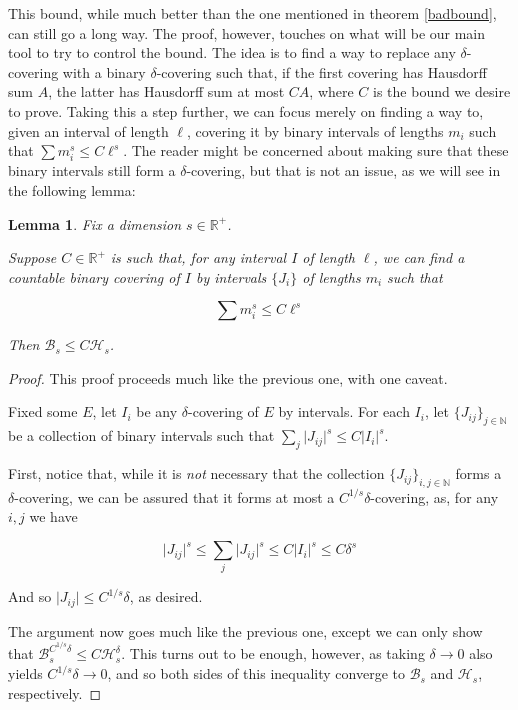 \documentclass[11pt]{amsart}
\newcommand{\R}{\mathbb{R}}
\newcommand{\N}{\mathbb{N}}
\newcommand{\HH}{\mathcal{H}}
\newcommand{\BB}{\mathcal{B}}
\newtheorem{lemma}{Lemma}
\begin{document}
This bound, while much better than the one mentioned in theorem \ref{badbound}, can still go a long way. The proof, however, touches on what will be our main tool to try to control the bound. The idea is to find a way to replace any $\delta$-covering with a binary $\delta$-covering such that, if the first covering has Hausdorff sum $A$, the latter has Hausdorff sum at most $CA$, where $C$ is the bound we desire to prove. Taking this a step further, we can focus merely on finding a way to, given an interval of length $\ell$, covering it by binary intervals of lengths $m_i$ such that $\sum m_i^s \leq C \ell^s$. The reader might be concerned about making sure that these binary intervals still form a $\delta$-covering, but that is not an issue, as we will see in the following lemma:

\begin{lemma}
Fix a dimension $s \in \R^+$.

Suppose $C \in \R^+$ is such that, for any interval $I$ of length $\ell$, we can find a countable binary covering of $I$ by intervals $\{J_i\}$ of lengths $m_i$ such that

\[\sum m_i^s \leq C \ell^s\]

Then $\BB_s \leq C \HH_s$.
\end{lemma}

\begin{proof}
This proof proceeds much like the previous one, with one caveat.

Fixed some $E$, let $I_i$ be any $\delta$-covering of $E$ by intervals. For each $I_i$, let $\{J_{ij}\}_{j \in \N}$ be a collection of binary intervals such that  $\sum_j \lvert J_{ij} \rvert^s \leq C \lvert I_i \rvert^s$.

First, notice that, while it is \emph{not} necessary that the collection $\{J_{ij}\}_{i,j \in \N}$ forms a $\delta$-covering, we can be assured that it forms at most a $C^{1/s}\delta$-covering, as, for any $i, j$ we have

\[ \lvert J_{ij} \rvert^s \leq \sum_j \lvert J_{ij} \rvert^s \leq C \lvert I_i \rvert^s \leq C \delta^s\]

And so $\lvert J_{ij} \rvert \leq C^{1/s} \delta$, as desired.

The argument now goes much like the previous one, except we can only show that $\BB_s^{C^{1/s} \delta} \leq C \HH_s^\delta$. This turns out to be enough, however, as taking $\delta \to 0$ also yields $C^{1/s} \delta \to 0$, and so both sides of this inequality converge to $\BB_s$ and $\HH_s$, respectively.
\end{proof}
\end{document}
